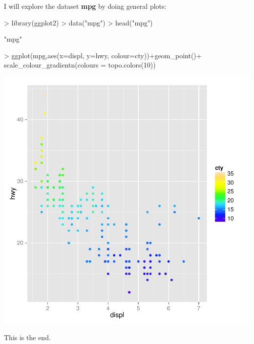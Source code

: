 \documentclass{article}
\begin{document}


I will explore the dataset \textbf{mpg} by doing general plots:

\begin{Schunk}
\begin{Sinput}
> library(ggplot2)
> data("mpg")
> head("mpg")
\end{Sinput}
\begin{Soutput}
[1] "mpg"
\end{Soutput}
\begin{Sinput}
> ggplot(mpg,aes(x=displ, y=hwy, colour=cty))+geom_point()+ scale_colour_gradientn(colours = topo.colors(10))
\end{Sinput}
\end{Schunk}
\includegraphics{tutorialJY-Cars1}

This is the end.
\end{document}
